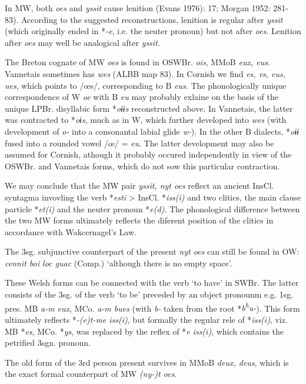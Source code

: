 {In MW, both \textit{oes} and \textit{yssit} cause lenition (Evans 1976): 17; Morgan 1952: 281-83). According to the suggested reconstructions, lenition is regular after \textit{yssit} (which originally ended in *\textit{-e}, i.e. the neuter pronoun) but not after \textit{oes}. Lenition after \textit{oes} may well be analogical after \textit{yssit}.

The Breton cognate of MW \textit{oes} is found in OSWBr. \textit{ois}, MMoB \textit{eux, eus}. Vannetais sometimes has \textit{wes} (ALBB map 83). In Cornish we find \textit{es, vs, eus, ues}, which points to /œs/, corresponding to B \textit{eus}. The phonologically unique correspondence of W \textit{oe} with B \textit{eu} may probably exlaine on the basis of the unique LPBr. disyllabic form *\textit{oɨɨs} reconstructed above. In Vannetais, the latter was contracted to *\textit{oɨs}, much as in W, which further developed into \textit{wes} (with development of \textit{o-} into a consonantal labial glide \textit{w-}). In the other B dialects, *\textit{oɨɨ} fused into a rounded vowel /œ/ = \textit{eu}. The latter development may also be assumed for Cornish, athough it probably occured independently in view of the OSWBr. and Vannetais forms, which do not sow this particular contraction.

We may conclude that the MW pair \textit{yssit, nyt oes} reflect an ancient InsCl. syntagma invovling the verb *\textit{esti} > InsCl. *\textit{iss(i)} and two clitics, the main clause particle *\textit{et(i)} and the neuter pronoun *\textit{e(d)}. The phonological difference between the two MW forms ultimately reflects the diferent position of the clitics in accordance with Wakcernagel's Law. 

The 3sg. subjunctive counterpart of the present \textit{nyt oes} can still be found in OW: \textit{cennit boi loc guac} (Comp.) `although there is no empty space'. 

These Welsh forms can be connected with the verb `to have' in SWBr. The latter consists of the 3sg. of the verb `to be' preceded by an object pronounm e.g. 1sg. pres. MB \textit{a-m eux}, MCo. \textit{a-m bues} (with \textit{b-} taken from the root *\textit{b\textsuperscript{h}u-}). This form ultimately reflects *\textit{-(e)t-me iss(i)}, but formally the regular rele of *\textit{iss(i)}, viz. MB *\textit{es}, MCo. *\textit{ys}, was replaced by the reflex of *\textit{e iss(i)}, which contains the petrified 3sgn. pronoun.

The old form of the 3rd person present survives in MMoB \textit{deux, deus}, which is the exact formal counterpart of MW \textit{(ny-)t  oes}.

}
